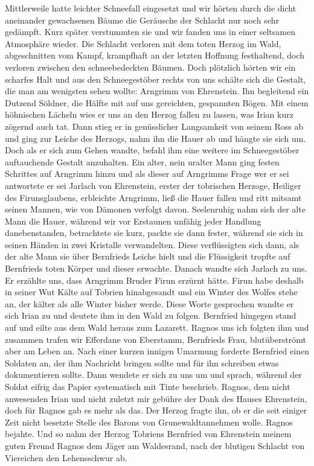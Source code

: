 Mittlerweile hatte leichter Schneefall eingesetzt und wir hörten durch die dicht aneinander gewachsenen Bäume die Geräusche der Schlacht nur noch sehr gedämpft. Kurz später verstummten sie und wir fanden uns in einer seltsamen Atmosphäre wieder. Die Schlacht verloren mit dem toten Herzog im Wald, abgeschnitten vom Kampf, krampfhaft an der letzten Hoffnung festhaltend, doch verloren zwischen den schneebedeckten Bäumen. Doch plötzlich hörten wir ein scharfes Halt und aus den Schneegestöber rechts von uns schälte sich die Gestalt, die man am wenigsten sehen wollte: Arngrimm von Ehrenstein. Ihn begleitend ein Dutzend Söldner, die Hälfte mit auf uns gereichten, gespannten Bögen. Mit einem höhnischen Lächeln wies er uns an den Herzog fallen zu lassen, was Irian kurz zögernd auch tat. Dann stieg er in genüsslicher Langsamkeit von seinem Ross ab und ging zur Leiche des Herzogs, nahm ihn die Hauer ab und hängte sie sich um. Doch als er sich zum Gehen wandte, befahl ihm eine weitere im Schneegestöber auftauchende Gestalt anzuhalten. Ein alter, nein uralter Mann ging festen Schrittes auf Arngrimm hinzu und als dieser auf Arngrimms Frage wer er sei antwortete er sei Jarlach von Ehrenstein, erster der tobrischen Herzoge, Heiliger des Firunsglaubens, erbleichte Arngrimm, ließ die Hauer fallen und ritt mitsamt seinen Mannen, wie von Dämonen verfolgt davon. Seelenruhig nahm sich der alte Mann die Hauer, während wir vor Erstaunen unfähig jeder Handlung danebenstanden, betrachtete sie kurz, packte sie dann fester, während sie sich in seinen Händen in zwei Kristalle verwandelten. Diese verflüssigten sich dann, als der alte Mann sie über Bernfrieds Leiche hielt und die Flüssigkeit tropfte auf Bernfrieds toten Körper und dieser erwachte. Danach wandte sich Jarlach zu uns. Er erzählte uns, dass Arngrimm Bruder Firun erzürnt hätte. Firun habe deshalb in seiner Wut Kälte auf Tobrien hinabgesandt und ein Winter des Wolfes stehe an, der kälter als alle Winter bisher werde. Diese Worte gesprochen wandte er sich Irian zu und deutete ihm in den Wald zu folgen. Bernfried hingegen stand auf und eilte aus dem Wald heraus zum Lazarett. Ragnos uns ich folgten ihm und zusammen trafen wir Efferdane von Eberstamm, Bernfrieds Frau, blutüberströmt aber am Leben an. Nach einer kurzen innigen Umarmung forderte Bernfried einen Soldaten an, der ihm Nachricht bringen sollte und für ihn schreiben etwas dokumentieren sollte. Dann wendete er sich zu uns um und sprach, während der Soldat eifrig das Papier systematisch mit Tinte beschrieb. Ragnos, dem nicht anwesenden Irian und nicht zuletzt mir gebühre der Dank des Hauses Ehrenstein, doch für Ragnos gab es mehr als das. Der Herzog fragte ihn, ob er die seit einiger Zeit nicht besetzte Stelle des Barons von Grunewaldtannehmen wolle. Ragnos bejahte. Und so nahm der Herzog Tobriens Bernfried von Ehrenstein meinem guten Freund Ragnos dem Jäger am Waldesrand, nach der blutigen Schlacht von Viereichen den Lehensschwur ab.

